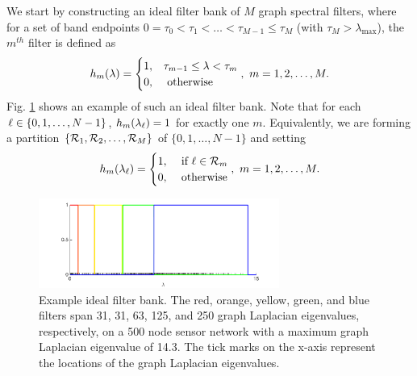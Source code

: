\documentclass[journal, 10pt]{IEEEtran}
\begin{document}
We start by constructing an ideal filter bank of $M$ graph spectral filters, where for a set of band endpoints $0=\tau_0 < \tau_1 < \ldots < \tau_{M-1} \leq \tau_M$ (with $\tau_M > \lambda_{\max}$), the $m^{th}$ filter is defined as
\begin{align} \label{Eq:bandpass}
{h}_m(\lambda)=
\begin{cases}
1,& \tau_{m-1} \leq \lambda < \tau_m  \\
0,&\hbox{ otherwise}
\end{cases},~m=1,2,\ldots,M.
\end{align}
 Fig. \ref{Fig:fb} shows an example of such an ideal filter bank. Note that for each $\ell \in \{0,1,\ldots,N-1\}$, ${h}_m(\lambda_\ell)=1$ for exactly one $m$. 
Equivalently, we are forming a partition $\{{\cal R}_1,{\cal R}_2,\ldots,{\cal R}_M\}$ of $\{0,1,\ldots,N-1\}$ and setting
\begin{align*}
{h}_m(\lambda_{\l})=
\begin{cases}
1,&\hbox{ if } {\l} \in {\cal R}_m \\
0,&\hbox{ otherwise}
\end{cases},~m=1,2,\ldots,M.
\end{align*}

\begin{figure}[t]
\centerline{\includegraphics[width=3.1in]{fig_filter_bank}}
\caption{Example ideal filter bank. The red, orange, yellow, green, and blue filters span 31, 31, 63, 125, and 250 graph Laplacian eigenvalues, respectively, on a 500 node sensor network with %
a maximum graph Laplacian eigenvalue of 14.3. The tick marks on the x-axis represent the locations of the graph Laplacian eigenvalues.}\label{Fig:fb}
\end{figure}
\end{document}
